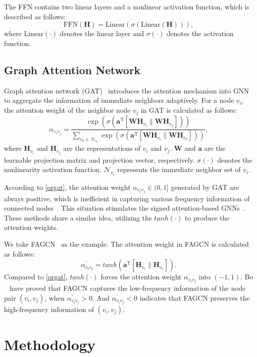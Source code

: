 \documentclass[sigconf, screen]{acmart}
\begin{document}
The FFN contains two linear layers and a nonlinear activation function, which is described as follows:
\begin{equation}
    \mathrm{FFN}(\mathbf{H}) = \mathrm{Linear}(\sigma(\mathrm{Linear(\mathbf{H})})),
    \label{ffn}
\end{equation}
where $\mathrm{Linear}(\cdot)$ denotes the linear layer and $\sigma(\cdot)$ denotes the activation function.

\subsection{Graph Attention Network}\label{sgat}
Graph attention network (GAT)~\cite{gat} introduces the attention mechanism into GNN to aggregate the information of immediate neighbors adaptively.
For a node $v_i$, the attention weight of the neighbor node $v_j$ in GAT is calculated as follows:
\begin{equation}
\alpha_{v_i v_j}=\frac{\exp (\sigma(\mathbf{a}^{\mathrm{T}}[\mathbf{W} \mathbf{H}_{v_i} \| \mathbf{W} \mathbf{H}_{v_j}]))}{\sum_{v_k \in \mathcal{N}_{v_i}} \exp \left(\sigma\left(\mathbf{a}^{\mathrm{T}}\left[\mathbf{W} \mathbf{H}_{v_i} \| \mathbf{W} \mathbf{H}_{v_k}\right]\right)\right)},
\label{orgat}
\end{equation}
where $\mathbf{H}_{v_i}$ and $\mathbf{H}_{v_j}$ are the representations of $v_i$ and $v_j$.
$\mathbf{W}$ and $\mathbf{a}$ are the learnable projection matrix and projection vector, respectively. $\sigma(\cdot)$ denotes the nonlinearity activation function.
$\mathcal{N}_{v_i}$ represents the immediate neighbor set of $v_i$.


According to \autoref{orgat}, the attention weight $\alpha_{v_i v_j}\in (0,1]$ generated by GAT are always positive, which is inefficient in capturing various frequency information of connected nodes~\cite{fagcn}.
This situation stimulates the signed attention-based GNNs~\cite{fagcn,sign1,sign2}.
These methods share a similar idea, utilizing the $\mathit{tanh}(\cdot)$ to produce the attention weights.

We take FAGCN~\cite{fagcn} as the example. The attention weight in FAGCN is calculated as follows:
\begin{equation}
\alpha_{v_i v_j}^{\prime}=\mathit{tanh}(\mathbf{a}^{\mathrm{T}}[\mathbf{H}_{v_i} \| \mathbf{H}_{v_j}]).
\label{faatt}
\end{equation}
Compared to \autoref{orgat}, $\mathit{tanh}(\cdot)$ forces the attention weight $\alpha_{v_i v_j}^{\prime}$ into $(-1,1)$.
Bo \etal~\cite{fagcn} have proved that FAGCN captures the low-frequency information of the node pair $(v_i,v_j)$, when $\alpha_{v_i v_j}^{\prime} > 0$. And $\alpha_{v_i v_j}^{\prime} < 0$ indicates that FAGCN preserves the high-frequency information of $(v_i,v_j)$. \section{Methodology}
\end{document}
